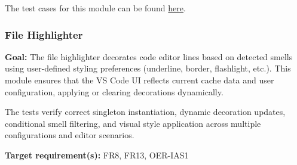 \documentclass[12pt, titlepage]{article}
\begin{document}
\noindent The test cases for this module can be found
\href{https://github.com/ssm-lab/capstone--sco-vs-code-plugin/blob/plugin-multi-file/test/api/backend.test.ts}{here}.

\subsubsection{File Highlighter}

\textbf{Goal:} The file highlighter decorates code editor lines based on detected smells using user-defined styling preferences (underline, border, flashlight, etc.). This module ensures that the VS Code UI reflects current cache data and user configuration, applying or clearing decorations dynamically.

\medskip

\noindent The tests verify correct singleton instantiation, dynamic decoration updates, conditional smell filtering, and visual style application across multiple configurations and editor scenarios.

\medskip

\noindent\textbf{Target requirement(s):} FR8, FR13, OER-IAS1~\cite{SRS}
\end{document}
